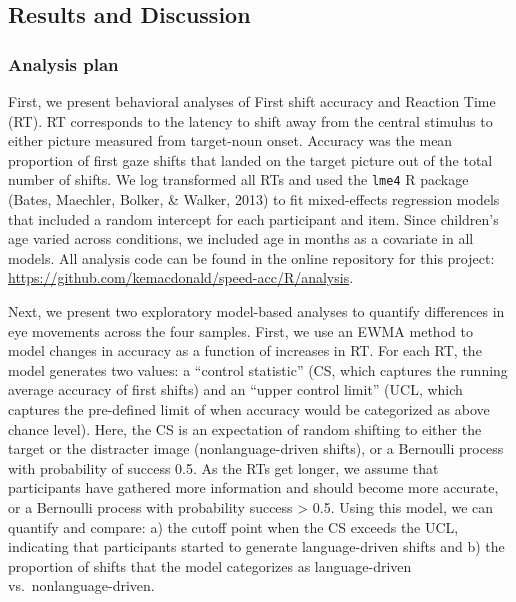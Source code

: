\documentclass[10pt, letterpaper]{article}
\begin{document}
\subsection{Results and Discussion}\label{results-and-discussion}

\subsubsection{Analysis plan}\label{analysis-plan}

First, we present behavioral analyses of First shift accuracy and
Reaction Time (RT). RT corresponds to the latency to shift away from the
central stimulus to either picture measured from target-noun onset.
Accuracy was the mean proportion of first gaze shifts that landed on the
target picture out of the total number of shifts. We log transformed all
RTs and used the \texttt{lme4} R package (Bates, Maechler, Bolker, \&
Walker, 2013) to fit mixed-effects regression models that included a
random intercept for each participant and item. Since children's age
varied across conditions, we included age in months as a covariate in
all models. All analysis code can be found in the online repository for
this project: \url{https://github.com/kemacdonald/speed-acc/R/analysis}.

Next, we present two exploratory model-based analyses to quantify
differences in eye movements across the four samples. First, we use an
EWMA method to model changes in accuracy as a function of increases in
RT. For each RT, the model generates two values: a ``control statistic''
(CS, which captures the running average accuracy of first shifts) and an
``upper control limit'' (UCL, which captures the pre-defined limit of
when accuracy would be categorized as above chance level). Here, the CS
is an expectation of random shifting to either the target or the
distracter image (nonlanguage-driven shifts), or a Bernoulli process
with probability of success 0.5. As the RTs get longer, we assume that
participants have gathered more information and should become more
accurate, or a Bernoulli process with probability success \textgreater{}
0.5. Using this model, we can quantify and compare: a) the cutoff point
when the CS exceeds the UCL, indicating that participants started to
generate language-driven shifts and b) the proportion of shifts that the
model categorizes as language-driven vs.~nonlanguage-driven.
\end{document}

